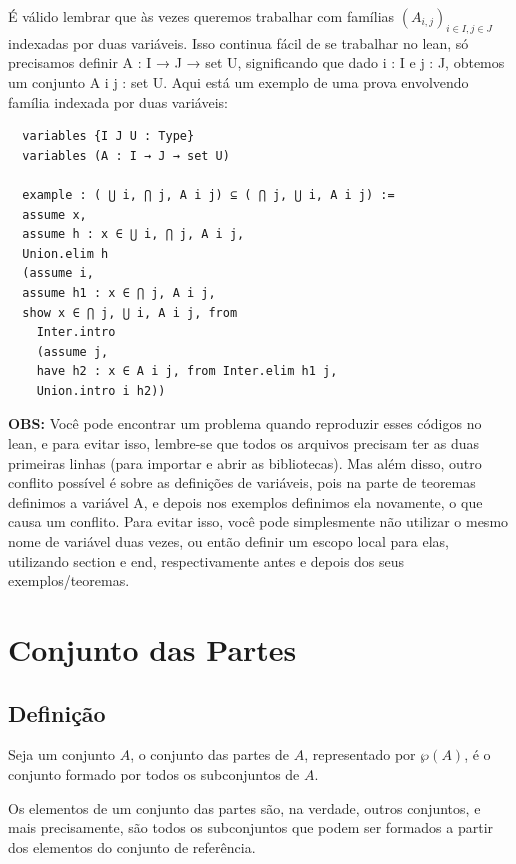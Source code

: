 É válido lembrar que às vezes queremos trabalhar com famílias $(A_{i,j})_{i \in I, j \in J}$ indexadas por duas variáveis. Isso continua fácil de se trabalhar no lean, só precisamos definir {\selectfont A : I → J → set U}, significando que dado {\selectfont i : I} e {\selectfont j : J}, obtemos um conjunto {\selectfont A i j : set U}. Aqui está um exemplo de uma prova envolvendo família indexada por duas variáveis:

\begin{lstlisting}
  variables {I J U : Type}
  variables (A : I → J → set U)

  example : ( ⋃ i, ⋂ j, A i j) ⊆ ( ⋂ j, ⋃ i, A i j) :=
  assume x,
  assume h : x ∈ ⋃ i, ⋂ j, A i j,
  Union.elim h
  (assume i,
  assume h1 : x ∈ ⋂ j, A i j,
  show x ∈ ⋂ j, ⋃ i, A i j, from
    Inter.intro
    (assume j,
    have h2 : x ∈ A i j, from Inter.elim h1 j,
    Union.intro i h2))\end{lstlisting}

\textbf{OBS:} Você pode encontrar um problema quando reproduzir esses códigos no lean, e para evitar isso, lembre-se que todos os arquivos precisam ter as duas primeiras linhas (para importar e abrir as bibliotecas). Mas além disso, outro conflito possível é sobre as definições de variáveis, pois na parte de teoremas definimos a variável {\selectfont A}, e depois nos exemplos definimos ela novamente, o que causa um conflito. Para evitar isso, você pode simplesmente não utilizar o mesmo nome de variável duas vezes, ou então definir um escopo local para elas, utilizando {\selectfont section} e {\selectfont end}, respectivamente antes e depois dos seus exemplos/teoremas.

{\selectfont }
\section{Conjunto das Partes}

\subsection{Definição}
Seja um conjunto $A$, o conjunto das partes de $A$, representado por $\wp(A)$, é o conjunto formado por todos os subconjuntos de $A$.

Os elementos de um conjunto das partes são, na verdade, outros conjuntos, e mais precisamente, são todos os subconjuntos que podem ser formados a partir dos elementos do conjunto de referência.

